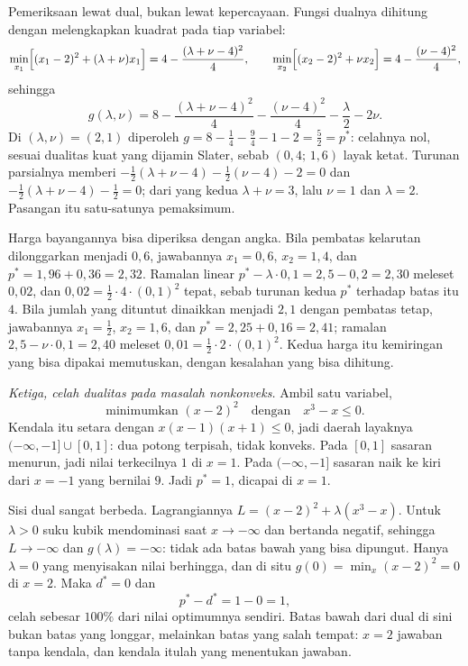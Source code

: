 Pemeriksaan lewat dual, bukan lewat kepercayaan. Fungsi dualnya dihitung dengan
melengkapkan kuadrat pada tiap variabel:
\[
  \min_{x_{1}}\Bigl[(x_{1}-2)^{2}+(\lambda+\nu)x_{1}\Bigr]
  =4-\frac{(\lambda+\nu-4)^{2}}{4},
  \qquad
  \min_{x_{2}}\Bigl[(x_{2}-2)^{2}+\nu x_{2}\Bigr]
  =4-\frac{(\nu-4)^{2}}{4},
\]
sehingga
\[
  g(\lambda,\nu)=8-\frac{(\lambda+\nu-4)^{2}}{4}-\frac{(\nu-4)^{2}}{4}
  -\frac{\lambda}{2}-2\nu .
\]
Di $(\lambda,\nu)=(2,1)$ diperoleh $g=8-\tfrac14-\tfrac94-1-2=\tfrac52=p^{*}$: celahnya
nol, sesuai dualitas kuat yang dijamin Slater, sebab $(0{,}4;\,1{,}6)$ layak ketat. Turunan
parsialnya memberi $-\tfrac12(\lambda+\nu-4)-\tfrac12(\nu-4)-2=0$ dan
$-\tfrac12(\lambda+\nu-4)-\tfrac12=0$; dari yang kedua $\lambda+\nu=3$, lalu $\nu=1$ dan
$\lambda=2$. Pasangan itu satu-satunya pemaksimum.

Harga bayangannya bisa diperiksa dengan angka. Bila pembatas kelarutan dilonggarkan
menjadi $0{,}6$, jawabannya $x_{1}=0{,}6$, $x_{2}=1{,}4$, dan
$p^{*}=1{,}96+0{,}36=2{,}32$. Ramalan linear $p^{*}-\lambda\cdot0{,}1=2{,}5-0{,}2=2{,}30$
meleset $0{,}02$, dan $0{,}02=\tfrac12\cdot4\cdot(0{,}1)^{2}$ tepat, sebab turunan kedua
$p^{*}$ terhadap batas itu $4$. Bila jumlah yang dituntut dinaikkan menjadi $2{,}1$ dengan
pembatas tetap, jawabannya $x_{1}=\tfrac12$, $x_{2}=1{,}6$, dan
$p^{*}=2{,}25+0{,}16=2{,}41$; ramalan $2{,}5-\nu\cdot0{,}1=2{,}40$ meleset
$0{,}01=\tfrac12\cdot2\cdot(0{,}1)^{2}$. Kedua harga itu kemiringan yang bisa dipakai
memutuskan, dengan kesalahan yang bisa dihitung.

\emph{Ketiga, celah dualitas pada masalah nonkonveks.} Ambil satu variabel,
\[
  \text{minimumkan } (x-2)^{2}\quad\text{dengan}\quad x^{3}-x\le0 .
\]
Kendala itu setara dengan $x(x-1)(x+1)\le0$, jadi daerah layaknya
$(-\infty,-1]\cup[0,1]$: dua potong terpisah, tidak konveks. Pada $[0,1]$ sasaran menurun,
jadi nilai terkecilnya $1$ di $x=1$. Pada $(-\infty,-1]$ sasaran naik ke kiri dari $x=-1$
yang bernilai $9$. Jadi $p^{*}=1$, dicapai di $x=1$.

Sisi dual sangat berbeda. Lagrangiannya $L=(x-2)^{2}+\lambda(x^{3}-x)$. Untuk
$\lambda>0$ suku kubik mendominasi saat $x\to-\infty$ dan bertanda negatif, sehingga
$L\to-\infty$ dan $g(\lambda)=-\infty$: tidak ada batas bawah yang bisa dipungut. Hanya
$\lambda=0$ yang menyisakan nilai berhingga, dan di situ $g(0)=\min_{x}(x-2)^{2}=0$ di
$x=2$. Maka $d^{*}=0$ dan
\[
  p^{*}-d^{*}=1-0=1 ,
\]
celah sebesar $100\%$ dari nilai optimumnya sendiri. Batas bawah dari dual di sini bukan
batas yang longgar, melainkan batas yang salah tempat: $x=2$ jawaban tanpa kendala, dan
kendala itulah yang menentukan jawaban.

